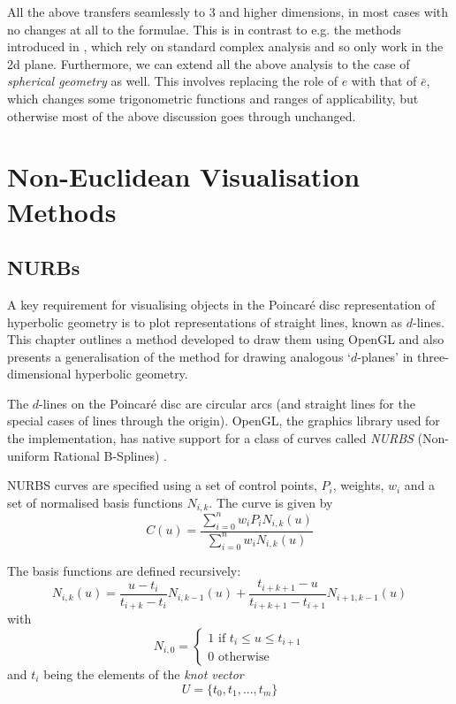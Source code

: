 All the above transfers seamlessly to 3 and higher dimensions, in
most cases with no changes at all to the formulae. This is in
contrast to e.g. the methods introduced in \cite{GEOM:brannan}, which
rely on standard complex analysis and so only work in the 2d
plane. Furthermore, we can extend all the above analysis to the
case of \textit{spherical geometry} as well. This involves
replacing the role of $e$ with that of $\bar{e}$, which changes
some trigonometric functions and ranges of applicability, but
otherwise most of the above discussion goes through unchanged.


\section{Non-Euclidean Visualisation Methods}
\subsection{NURBs}

A key requirement for visualising objects in the Poincar\'e disc
representation of hyperbolic geometry is to plot representations of
straight lines, known as $d$-lines. This chapter outlines a method 
developed to draw them using OpenGL and also presents a generalisation
of the method for drawing analogous `$d$-planes' in three-dimensional
hyperbolic geometry.


The $d$-lines on the Poincar\'e disc are circular arcs (and straight lines
for the special cases of lines through the origin). OpenGL, the graphics
library used for the implementation, has native support for a class
of curves called \emph{NURBS} (Non-uniform Rational B-Splines) 
\cite{mecg}. 


NURBS curves are specified using a set of control points, $P_i$,
weights, $w_i$ and a set of normalised basis functions $N_{i,k}$.
The curve is given by
\[
C(u) = \frac{\sum_{i=0}^n w_i P_i N_{i,k}(u)}{\sum_{i=0}^n w_i N_{i,k}(u)}
\]

The basis functions are defined recursively:
\[
N_{i,k}(u) = \frac{u - t_i}{t_{i+k} - t_i} N_{i,k-1}(u) +
  \frac{t_{i+k+1} - u}{t_{i+k+1} - t_{i+1}} N_{i+1,k-1}(u)
\]
with
\[
N_{i,0} = 
\begin{cases}
1 \mbox{ if } t_i \le u \le t_{i+1} \\ 
0 \mbox{ otherwise} 
\end{cases}
\]
and $t_i$ being the elements of the \emph{knot vector}
\[
U = \{ t_0, t_1, ... , t_m \}
\]

